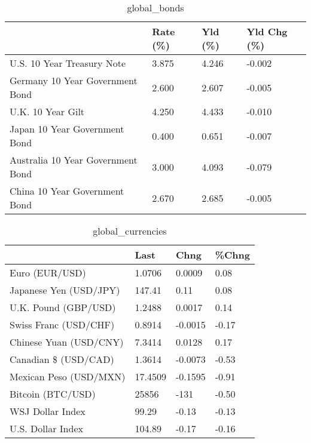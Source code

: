 \documentclass{article}%
\begin{document}
%


\begin{table}[htbp]%
\caption{global\_bonds}%
\centering%
\begin{adjustbox}{width=1\textwidth}%
\begin{tabular}{llll}
\toprule
                                  & Rate (\%) & Yld (\%) & Yld Chg (\%) \\
\midrule
       U.S. 10 Year Treasury Note &    3.875 &   4.246 &      -0.002 \\
  Germany 10 Year Government Bond &    2.600 &   2.607 &      -0.005 \\
                U.K. 10 Year Gilt &    4.250 &   4.433 &      -0.010 \\
    Japan 10 Year Government Bond &    0.400 &   0.651 &      -0.007 \\
Australia 10 Year Government Bond &    3.000 &   4.093 &      -0.079 \\
    China 10 Year Government Bond &    2.670 &   2.685 &      -0.005 \\
\bottomrule
\end{tabular}
%
\end{adjustbox}%
\end{table}

%


\begin{table}[htbp]%
\caption{global\_currencies}%
\centering%
\begin{adjustbox}{width=1\textwidth}%
\begin{tabular}{llll}
\toprule
                       &    Last &    Chng & \%Chng \\
\midrule
        Euro (EUR/USD) &  1.0706 &  0.0009 &  0.08 \\
Japanese Yen (USD/JPY) &  147.41 &    0.11 &  0.08 \\
  U.K. Pound (GBP/USD) &  1.2488 &  0.0017 &  0.14 \\
 Swiss Franc (USD/CHF) &  0.8914 & -0.0015 & -0.17 \\
Chinese Yuan (USD/CNY) &  7.3414 &  0.0128 &  0.17 \\
  Canadian \$ (USD/CAD) &  1.3614 & -0.0073 & -0.53 \\
Mexican Peso (USD/MXN) & 17.4509 & -0.1595 & -0.91 \\
     Bitcoin (BTC/USD) &   25856 &    -131 & -0.50 \\
      WSJ Dollar Index &   99.29 &   -0.13 & -0.13 \\
     U.S. Dollar Index &  104.89 &   -0.17 & -0.16 \\
\bottomrule
\end{tabular}
%
\end{adjustbox}%
\end{table}
\end{document}
